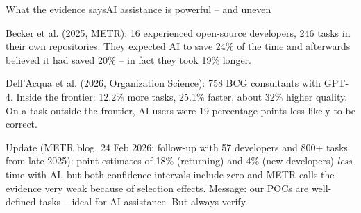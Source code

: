 \documentclass[aspectratio=169,11pt]{beamer}
\begin{document}
\begin{frame}{What the evidence says}{AI assistance is powerful -- and uneven}
{  Becker et al. (2025, METR): 16 experienced open-source developers, 246 tasks in their own repositories. They expected AI to save 24\% of the time and afterwards believed it had saved 20\% -- in fact they took 19\% longer.\par
  Dell'Acqua et al. (2026, Organization Science): 758 BCG consultants with GPT-4. Inside the frontier: 12.2\% more tasks, 25.1\% faster, about 32\% higher quality. On a task outside the frontier, AI users were 19 percentage points less likely to be correct.\par
  Update (METR blog, 24 Feb 2026; follow-up with 57 developers and 800+ tasks from late 2025): point estimates of 18\% (returning) and 4\% (new developers) \emph{less} time with AI, but both confidence intervals include zero and METR calls the evidence very weak because of selection effects. Message: our POCs are well-defined tasks -- ideal for AI assistance. But always verify.}
\end{frame}
\end{document}
